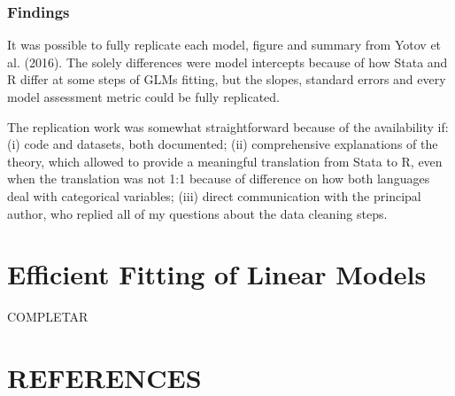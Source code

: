 \documentclass[12pt,reqno,oneside,pdftex]{formato-puc/puctesis} %
\begin{document}
\hypertarget{findings}{%
\subsection{Findings}\label{findings}}

It was possible to fully replicate each model, figure and summary from
Yotov et al. (2016). The solely differences were model intercepts
because of how Stata and R differ at some steps of GLMs fitting, but the
slopes, standard errors and every model assessment metric could be fully
replicated.

The replication work was somewhat straightforward because of the
availability if: (i) code and datasets, both documented; (ii)
comprehensive explanations of the theory, which allowed to provide a
meaningful translation from Stata to R, even when the translation was
not 1:1 because of difference on how both languages deal with
categorical variables; (iii) direct communication with the principal
author, who replied all of my questions about the data cleaning steps.

\chapter{Efficient Fitting of Linear Models}

COMPLETAR

\chapter*{REFERENCES}
\end{document}
